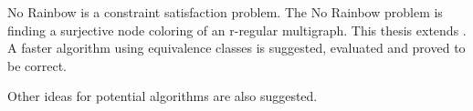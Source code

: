 No Rainbow is a constraint satisfaction problem.
The No Rainbow problem is finding a surjective node coloring of an r-regular multigraph.
This thesis extends \cite{sourceNoRainbow}.
A faster algorithm using equivalence classes is suggested, evaluated and proved to be correct.

Other ideas for potential algorithms are also suggested.


